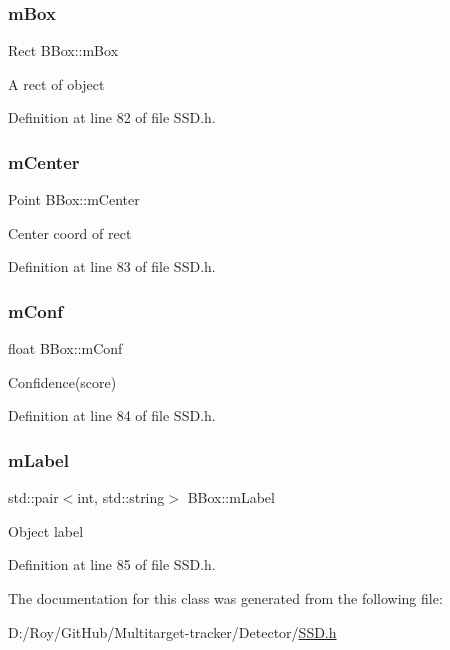 \subsubsection{\texorpdfstring{m\+Box}{mBox}}
{\footnotesize\ttfamily Rect B\+Box\+::m\+Box}

A rect of object 

Definition at line 82 of file S\+S\+D.\+h.

\mbox{\label{class_b_box_a4367a9314599320633ef19abfae3a83c}} 
\subsubsection{\texorpdfstring{m\+Center}{mCenter}}
{\footnotesize\ttfamily Point B\+Box\+::m\+Center}

Center coord of rect 

Definition at line 83 of file S\+S\+D.\+h.

\mbox{\label{class_b_box_ac2b9483e6f0372284e06724d7ae953ff}} 
\subsubsection{\texorpdfstring{m\+Conf}{mConf}}
{\footnotesize\ttfamily float B\+Box\+::m\+Conf}

Confidence(score) 

Definition at line 84 of file S\+S\+D.\+h.

\mbox{\label{class_b_box_a779985e94cd7b9b3c62208493de419be}} 
\subsubsection{\texorpdfstring{m\+Label}{mLabel}}
{\footnotesize\ttfamily std\+::pair$<$int, std\+::string$>$ B\+Box\+::m\+Label}

Object label 

Definition at line 85 of file S\+S\+D.\+h.



The documentation for this class was generated from the following file\+:\begin{DoxyCompactItemize}
\item 
D\+:/\+Roy/\+Git\+Hub/\+Multitarget-\/tracker/\+Detector/\mbox{\hyperlink{_s_s_d_8h}{S\+S\+D.\+h}}\end{DoxyCompactItemize}
